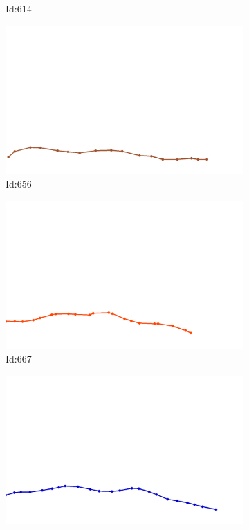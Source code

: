 \documentclass[12pt,twoside]{report}
\begin{document}
\begin{figure}
\begin{subfigure}[b]{0.20\textwidth}
\caption{Id:614}
\end{subfigure}
\begin{subfigure}[b]{0.20\textwidth}
\centering
\includegraphics[width=\textwidth]{../trajectories/656.png}
\caption{Id:656}
\end{subfigure}
\begin{subfigure}[b]{0.20\textwidth}
\centering
\includegraphics[width=\textwidth]{../trajectories/667.png}
\caption{Id:667}
\end{subfigure}
\begin{subfigure}[b]{0.20\textwidth}
\centering
\includegraphics[width=\textwidth]{../trajectories/721.png}

\end{subfigure}
\end{figure}
\end{document}
